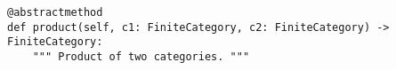 \par\begin{minipage}{76ex}
\begin{verbatim}
@abstractmethod
def product(self, c1: FiniteCategory, c2: FiniteCategory) -> FiniteCategory:
    """ Product of two categories. """
\end{verbatim}
\end{minipage}\par